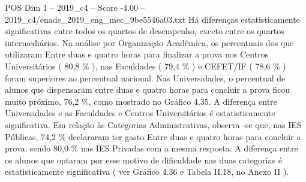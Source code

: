 \begin{textsample}{POS Dim 1 – 2019\_c4 – Score -4.00 – 2019\_c4/enade\_2019\_eng\_mec\_9be5546a03.txt}
Há diferenças estatisticamente significativas entre todos os quartos de desempenho, exceto entre os quartos intermediários.
Na análise por Organização Acadêmica, os percentuais dos que utilizaram Entre duas e quatro horas para finalizar a prova nos Centros Universitários ( 80,8 \% ), nas Faculdades ( 79,4 \% ) e CEFET/IF ( 78,6 \% ) foram superiores ao percentual nacional.
Nas Universidades, o percentual de alunos que dispensaram entre duas e quatro horas para concluir a prova ficou muito próximo, 76,2 \%, como mostrado no Gráfico 4.35.
A diferença entre Universidades e as Faculdades e Centros Universitários é estatisticamente significativa.
Em relação às Categorias Administrativas, observa -se que, nas IES Públicas, 74,2 \% declararam ter gasto Entre duas e quatro horas para concluir a prova, sendo 80,0 \% nas IES Privadas com a mesma resposta.
A diferença entre os alunos que optaram por esse motivo de dificuldade nas duas categorias é estatisticamente significativa ( ver Gráfico 4.36 e Tabela II.18, no Anexo II ).

\end{textsample}
